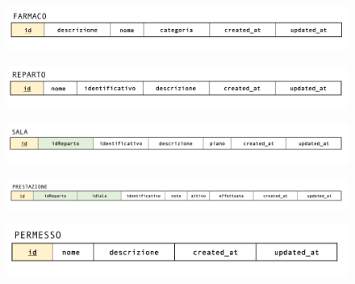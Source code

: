 \documentclass[paper=a4, fontsize=11pt,x11names]{report}
\begin{document}
\begin{figure}[H]
\begin{center}
\includegraphics[scale=0.3]{farmacoSchema}
\end{center}
\end{figure}

\begin{figure}[H]
\begin{center}
\includegraphics[scale=0.3]{repartoSchema}
\end{center}
\end{figure}

\begin{figure}[H]
\begin{center}
\includegraphics[scale=0.3]{salaSchema}
\end{center}
\end{figure}

\begin{figure}[H]
\begin{center}
\includegraphics[scale=0.26]{prestazioneSchema}
\end{center}
\end{figure}

\begin{figure}[H]
\begin{center}
\includegraphics[scale=0.3]{permessiSchema}
\end{center}
\end{figure}
\end{document}
